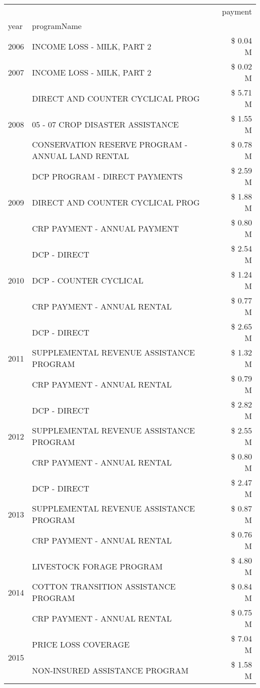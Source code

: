 \begin{tabular}{llr}
\toprule
 &  & payment \\
year & programName &  \\
\midrule
2006 & INCOME LOSS - MILK, PART 2 & \$ 0.04 M \\
\cline{1-3}
2007 & INCOME LOSS - MILK, PART 2 & \$ 0.02 M \\
\cline{1-3}
\multirow[t]{3}{*}{2008} & DIRECT AND COUNTER CYCLICAL PROG & \$ 5.71 M \\
 & 05 - 07 CROP DISASTER ASSISTANCE & \$ 1.55 M \\
 & CONSERVATION RESERVE PROGRAM - ANNUAL LAND RENTAL & \$ 0.78 M \\
\cline{1-3}
\multirow[t]{3}{*}{2009} & DCP PROGRAM - DIRECT PAYMENTS & \$ 2.59 M \\
 & DIRECT AND COUNTER CYCLICAL PROG & \$ 1.88 M \\
 & CRP PAYMENT - ANNUAL PAYMENT & \$ 0.80 M \\
\cline{1-3}
\multirow[t]{3}{*}{2010} & DCP - DIRECT & \$ 2.54 M \\
 & DCP - COUNTER CYCLICAL & \$ 1.24 M \\
 & CRP PAYMENT - ANNUAL RENTAL & \$ 0.77 M \\
\cline{1-3}
\multirow[t]{3}{*}{2011} & DCP - DIRECT & \$ 2.65 M \\
 & SUPPLEMENTAL REVENUE ASSISTANCE PROGRAM & \$ 1.32 M \\
 & CRP PAYMENT - ANNUAL RENTAL & \$ 0.79 M \\
\cline{1-3}
\multirow[t]{3}{*}{2012} & DCP - DIRECT & \$ 2.82 M \\
 & SUPPLEMENTAL REVENUE ASSISTANCE PROGRAM & \$ 2.55 M \\
 & CRP PAYMENT - ANNUAL RENTAL & \$ 0.80 M \\
\cline{1-3}
\multirow[t]{3}{*}{2013} & DCP - DIRECT & \$ 2.47 M \\
 & SUPPLEMENTAL REVENUE ASSISTANCE PROGRAM & \$ 0.87 M \\
 & CRP PAYMENT - ANNUAL RENTAL & \$ 0.76 M \\
\cline{1-3}
\multirow[t]{3}{*}{2014} & LIVESTOCK FORAGE PROGRAM & \$ 4.80 M \\
 & COTTON TRANSITION ASSISTANCE PROGRAM & \$ 0.84 M \\
 & CRP PAYMENT - ANNUAL RENTAL & \$ 0.75 M \\
\cline{1-3}
\multirow[t]{3}{*}{2015} & PRICE LOSS COVERAGE & \$ 7.04 M \\
 & NON-INSURED ASSISTANCE PROGRAM & \$ 1.58 M \\

\end{tabular}
